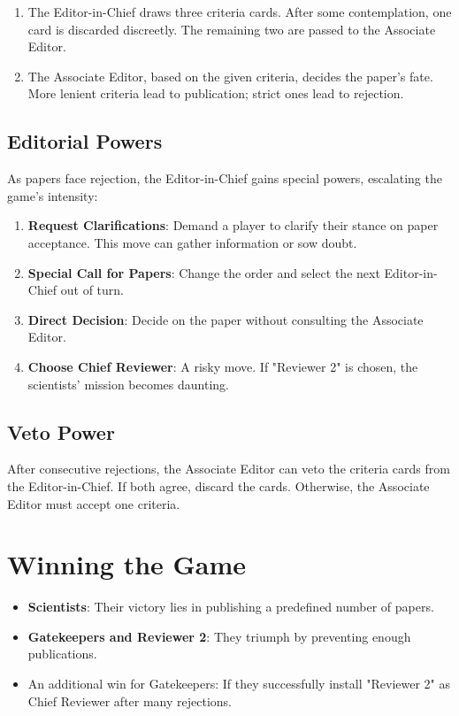 \documentclass[sigplan,screen,nonacm]{acmart}
\begin{document}
\begin{enumerate}
	\item The Editor-in-Chief draws three criteria cards. After some contemplation, one card is discarded discreetly. The remaining two are passed to the Associate Editor.
	\item The Associate Editor, based on the given criteria, decides the paper's fate. More lenient criteria lead to publication; strict ones lead to rejection.
\end{enumerate}

\subsection{Editorial Powers}

As papers face rejection, the Editor-in-Chief gains special powers, escalating the game's intensity:

\begin{enumerate}
	\item \textbf{Request Clarifications}: Demand a player to clarify their stance on paper acceptance. This move can gather information or sow doubt.
	\item \textbf{Special Call for Papers}: Change the order and select the next Editor-in-Chief out of turn.
	\item \textbf{Direct Decision}: Decide on the paper without consulting the Associate Editor.
	\item \textbf{Choose Chief Reviewer}: A risky move. If "Reviewer 2" is chosen, the scientists' mission becomes daunting.
\end{enumerate}

\subsection{Veto Power}

After consecutive rejections, the Associate Editor can veto the criteria cards from the Editor-in-Chief. If both agree, discard the cards. Otherwise, the Associate Editor must accept one criteria.

\section{Winning the Game}

\begin{itemize}
	\item \textbf{Scientists}: Their victory lies in publishing a predefined number of papers.
	\item \textbf{Gatekeepers and Reviewer 2}: They triumph by preventing enough publications.
	\item An additional win for Gatekeepers: If they successfully install "Reviewer 2" as Chief Reviewer after many rejections.
\end{itemize}
\end{document}
